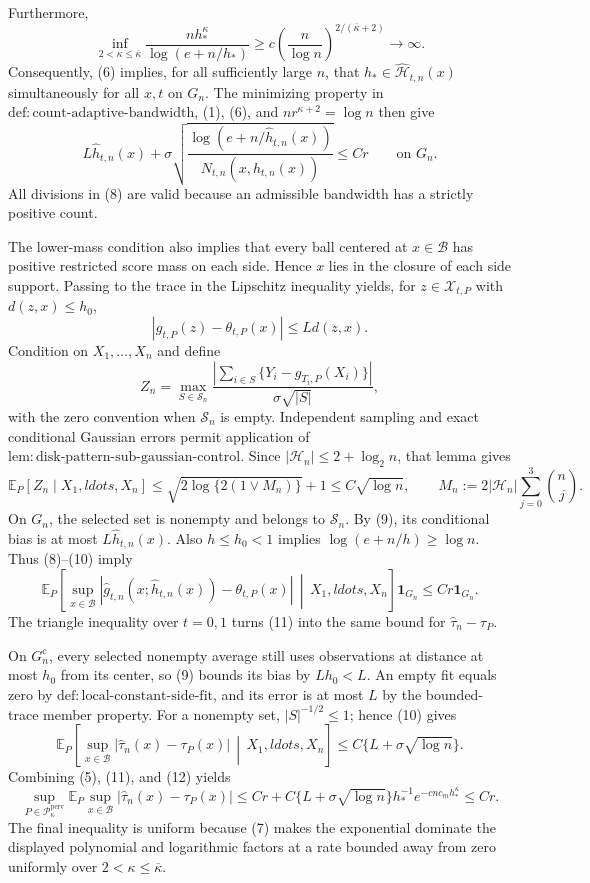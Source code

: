 Furthermore,
\[
\inf_{2<\kappa\le\overline\kappa}
\frac{nh_*^{\kappa}}{\log(e+n/h_*)}
\ge c\left(\frac n{\log n}\right)^{2/(\overline\kappa+2)}
\longrightarrow\infty. \tag{7}
\]
Consequently, (6) implies, for all sufficiently large \(n\), that \(h_*\in\widehat{\mathcal H}_{t,n}(x)\) simultaneously for all \(x,t\) on \(G_n\). The minimizing property in \(\mathrm{def:count\text{-}adaptive\text{-}bandwidth}\), (1), (6), and \(nr^{\kappa+2}=\log n\) then give
\[
L\widehat h_{t,n}(x)
+\sigma\sqrt{\frac{\log(e+n/\widehat h_{t,n}(x))}
{N_{t,n}(x,\widehat h_{t,n}(x))}}
\le Cr \qquad\text{on }G_n. \tag{8}
\]
All divisions in (8) are valid because an admissible bandwidth has a strictly positive count.

The lower-mass condition also implies that every ball centered at \(x\in\mathcal B\) has positive restricted score mass on each side. Hence \(x\) lies in the closure of each side support. Passing to the trace in the Lipschitz inequality yields, for \(z\in\mathcal X_{t,P}\) with \(d(z,x)\le h_0\),
\[
|g_{t,P}(z)-\theta_{t,P}(x)|\le Ld(z,x). \tag{9}
\]
Condition on \(X_1,\ldots,X_n\) and define
\[
Z_n=\max_{S\in\mathscr S_n}
\frac{\left|\sum_{i\in S}\{Y_i-g_{T_i,P}(X_i)\}\right|}
{\sigma\sqrt{|S|}},
\]
with the zero convention when \(\mathscr S_n\) is empty. Independent sampling and exact conditional Gaussian errors permit application of \(\mathrm{lem:disk\text{-}pattern\text{-}sub\text{-}gaussian\text{-}control}\). Since \(|\mathcal H_n|\le2+\log_2n\), that lemma gives
\[
\mathbb E_P[Z_n\mid X_1,ldots,X_n]
\le\sqrt{2\log\{2(1\vee M_n)\}}+1
\le C\sqrt{\log n}, \qquad
M_n:=2|\mathcal H_n|\sum_{j=0}^3\binom nj. \tag{10}
\]
On \(G_n\), the selected set is nonempty and belongs to \(\mathscr S_n\). By (9), its conditional bias is at most \(L\widehat h_{t,n}(x)\). Also \(h\le h_0<1\) implies \(\log(e+n/h)\ge\log n\). Thus (8)--(10) imply
\[
\mathbb E_P\left[
\sup_{x\in\mathcal B}
|\widehat g_{t,n}(x;\widehat h_{t,n}(x))-\theta_{t,P}(x)|
\,\middle|\,X_1,ldots,X_n\right]
\mathbf1_{G_n}
\le Cr\mathbf1_{G_n}. \tag{11}
\]
The triangle inequality over \(t=0,1\) turns (11) into the same bound for \(\widehat\tau_n-\tau_P\).

On \(G_n^c\), every selected nonempty average still uses observations at distance at most \(h_0\) from its center, so (9) bounds its bias by \(Lh_0<L\). An empty fit equals zero by \(\mathrm{def:local\text{-}constant\text{-}side\text{-}fit}\), and its error is at most \(L\) by the bounded-trace member property. For a nonempty set, \(|S|^{-1/2}\le1\); hence (10) gives
\[
\mathbb E_P\left[
\sup_{x\in\mathcal B}|\widehat\tau_n(x)-\tau_P(x)|
\,\middle|\,X_1,ldots,X_n\right]
\le C\{L+\sigma\sqrt{\log n}\}. \tag{12}
\]
Combining (5), (11), and (12) yields
\[
\sup_{P\in\mathcal P_{\kappa}^{\mathrm{perv}}}
\mathbb E_P\sup_{x\in\mathcal B}|\widehat\tau_n(x)-\tau_P(x)|
\le Cr+C\{L+\sigma\sqrt{\log n}\}h_*^{-1}
e^{-cnc_mh_*^{\kappa}}
\le Cr. \tag{13}
\]
The final inequality is uniform because (7) makes the exponential dominate the displayed polynomial and logarithmic factors at a rate bounded away from zero uniformly over \(2<\kappa\le\overline\kappa\).

